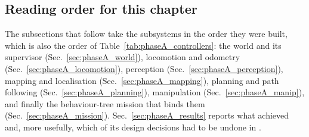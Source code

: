 \subsection{Reading order for this chapter}

The subsections that follow take the subsystems in the order they were
built, which is also the order of Table~\ref{tab:phaseA_controllers}:
the world and its supervisor (Sec.~\ref{sec:phaseA_world}), locomotion
and odometry (Sec.~\ref{sec:phaseA_locomotion}), perception
(Sec.~\ref{sec:phaseA_perception}), mapping and localisation
(Sec.~\ref{sec:phaseA_mapping}), planning and path following
(Sec.~\ref{sec:phaseA_planning}), manipulation
(Sec.~\ref{sec:phaseA_manip}), and finally the behaviour-tree mission
that binds them (Sec.~\ref{sec:phaseA_mission}).
Sec.~\ref{sec:phaseA_results} reports what \phaseA{} achieved and,
more usefully, which of its design decisions had to be undone in
\phaseB{}.
